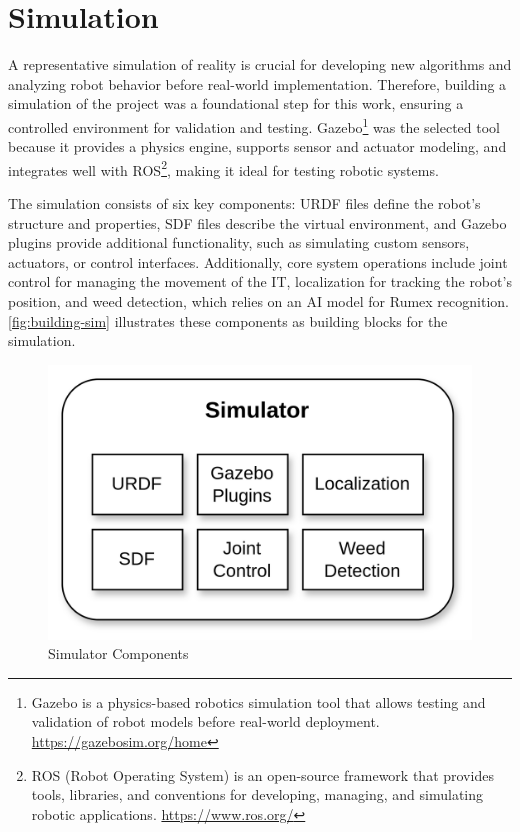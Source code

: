 \section{Simulation}\label{sec:simulation}
A representative simulation of reality is crucial for developing new algorithms and analyzing robot behavior before real-world implementation. Therefore, building a simulation of the project was a foundational step for this work, ensuring a controlled environment for validation and testing. Gazebo\footnote{Gazebo is a physics-based robotics simulation tool that allows testing and validation of robot models before real-world deployment. \url{https://gazebosim.org/home}} was the selected tool because it provides a physics engine, supports sensor and actuator modeling, and integrates well with ROS\footnote{ROS (Robot Operating System) is an open-source framework that provides tools, libraries, and conventions for developing, managing, and simulating robotic applications. \url{https://www.ros.org/}}, making it ideal for testing robotic systems.

The simulation consists of six key components: URDF files define the robot's structure and properties, SDF files describe the virtual environment, and Gazebo plugins provide additional functionality, such as simulating custom sensors, actuators, or control interfaces. Additionally, core system operations include joint control for managing the movement of the \ac{IT}, localization for tracking the robot’s position, and weed detection, which relies on an AI model for Rumex recognition. \autoref{fig:building-sim} illustrates these components as building blocks for the simulation.

\begin{figure}
    \centering
    \includegraphics[width=0.5\linewidth]{gfx/ch03/simulator.png}
    \caption{Simulator Components}
    \label{fig:building-sim}
\end{figure}

